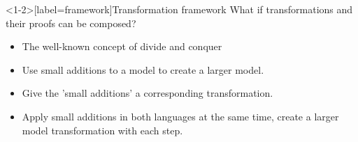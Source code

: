 
\begin{frame}<1-2>[label=framework]{Transformation framework}
    What if transformations and their proofs can be composed? \pause
    \begin{itemize}
        \item The well-known concept of divide and conquer
        \item Use small additions to a model to create a larger model. \pause
        \item Give the 'small additions' a corresponding transformation.
        \item Apply small additions in both languages at the same time, create a larger model transformation with each step.
    \end{itemize}
\end{frame}

